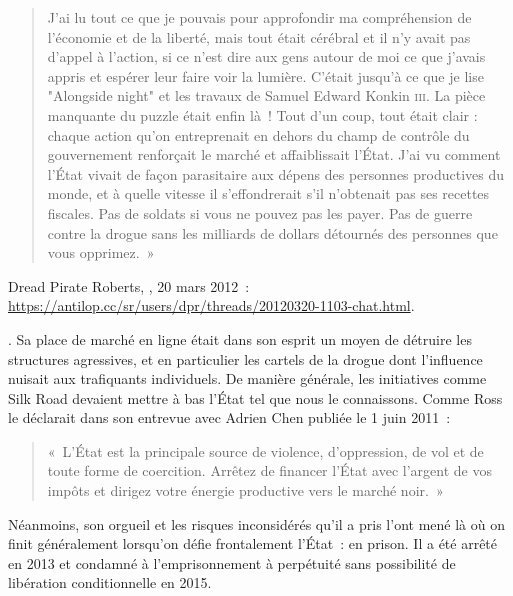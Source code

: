 {\begin{quote}
J'ai lu tout ce que je pouvais pour approfondir ma compréhension de l'économie et de la liberté, mais tout était cérébral et il n'y avait pas d'appel à l'action, si ce n'est dire aux gens autour de moi ce que j'avais appris et espérer leur faire voir la lumière. C'était jusqu'à ce que je lise "Alongside night" et les travaux de Samuel Edward Konkin \textsc{iii}. La pièce manquante du puzzle était enfin là~! Tout d'un coup, tout était clair : chaque action qu'on entreprenait en dehors du champ de contrôle du gouvernement renforçait le marché et affaiblissait l'État. J'ai vu comment l'État vivait de façon parasitaire aux dépens des personnes productives du monde, et à quelle vitesse il s'effondrerait s'il n'obtenait pas ses recettes fiscales. Pas de soldats si vous ne pouvez pas les payer. Pas de guerre contre la drogue sans les milliards de dollars détournés des personnes que vous opprimez.~»
\end{quote}
Dread Pirate Roberts, , 20 mars 2012~: \url{https://antilop.cc/sr/users/dpr/threads/20120320-1103-chat.html}.}. Sa place de marché en ligne était dans son esprit un moyen de détruire les structures agressives, et en particulier les cartels de la drogue dont l'influence nuisait aux trafiquants individuels. De manière générale, les initiatives comme Silk Road devaient mettre à bas l'État tel que nous le connaissons. Comme Ross le déclarait dans son entrevue avec Adrien Chen publiée le 1\ier{} juin 2011~:

\begin{quote}
«~L'État est la principale source de violence, d'oppression, de vol et de toute forme de coercition. Arrêtez de financer l'État avec l'argent de vos impôts et dirigez votre énergie productive vers le marché noir.~»
\end{quote}

Néanmoins, son orgueil et les risques inconsidérés qu'il a pris l'ont mené là où on finit généralement lorsqu'on défie frontalement l'État~: en prison. Il a été arrêté en 2013 et condamné à l'emprisonnement à perpétuité sans possibilité de libération conditionnelle en 2015.

